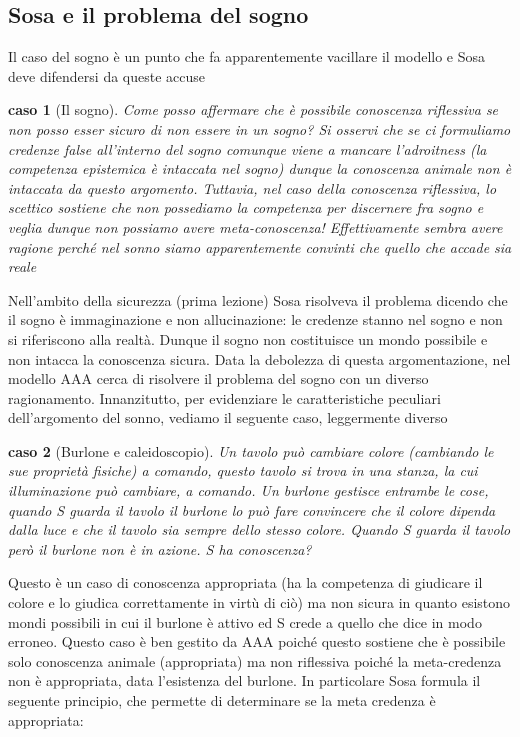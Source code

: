\documentclass[10pt,a4paper]{article}
\newtheorem{caso}{caso}
\begin{document}
\subsection{Sosa e il problema del sogno}
Il caso del sogno è un punto che fa apparentemente vacillare il modello e Sosa deve difendersi da queste accuse
\begin{caso}[Il sogno]
	Come posso affermare che è possibile conoscenza riflessiva se non posso esser sicuro di non essere in un sogno? Si osservi che se ci formuliamo credenze false all'interno del sogno comunque viene a mancare l'adroitness (la competenza epistemica è intaccata nel sogno) dunque la conoscenza animale non è intaccata da questo argomento. Tuttavia, nel caso della conoscenza riflessiva, lo scettico sostiene che non possediamo la competenza per discernere fra sogno e veglia dunque non possiamo avere meta-conoscenza! Effettivamente sembra avere ragione perché nel sonno siamo apparentemente convinti che quello che accade sia reale
\end{caso}
Nell'ambito della sicurezza (prima lezione) Sosa risolveva il problema dicendo che il sogno è immaginazione e non allucinazione: le credenze stanno nel sogno e non si riferiscono alla realtà. Dunque il sogno non costituisce un mondo possibile e non intacca la conoscenza sicura. Data la debolezza di questa argomentazione, nel modello AAA cerca di risolvere il problema del sogno con un diverso ragionamento. 
Innanzitutto, per evidenziare le caratteristiche peculiari dell'argomento del sonno, vediamo il seguente caso, leggermente diverso
\begin{caso}[Burlone e caleidoscopio]
	Un tavolo può cambiare colore (cambiando le sue proprietà fisiche) a comando, questo tavolo si trova in una stanza, la cui illuminazione può cambiare, a comando. Un burlone gestisce entrambe le cose, quando S guarda il tavolo il burlone lo può fare convincere che il colore dipenda dalla luce e che il tavolo sia sempre dello stesso colore. Quando S guarda il tavolo però il burlone non è in azione. S ha conoscenza?
\end{caso}
Questo è un caso di conoscenza appropriata (ha la competenza di giudicare il colore e lo giudica correttamente in virtù di ciò) ma non sicura in quanto esistono mondi possibili in cui il burlone è attivo ed S crede a quello che dice in modo erroneo. Questo caso è ben gestito da AAA poiché questo sostiene che è possibile solo conoscenza animale (appropriata) ma non riflessiva poiché la meta-credenza non è appropriata, data l'esistenza del burlone. In particolare Sosa formula il seguente principio, che permette di determinare se la meta credenza è appropriata:
\end{document}
